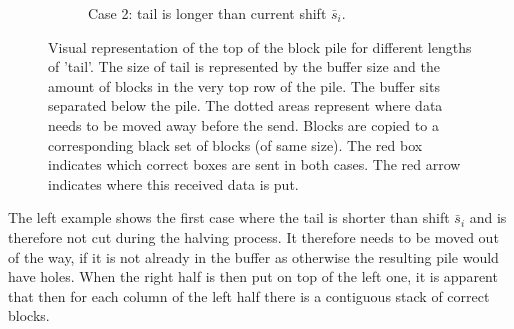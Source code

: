 \begin{figure}[h]
\begin{subfigure}{0.49\textwidth}
	\caption{Case 2: tail is longer than current shift $\bar{s}_i$.}
	\label{pileCases:case2}
	\end{subfigure}
%		
%		
%		
%

	\caption{Visual representation of the top of the block pile for different lengths of 'tail'. The size of tail is represented by the buffer size and the amount of blocks in the very top row of the pile. The buffer sits separated below the pile. The dotted areas represent where data needs to be moved away before the send. Blocks are copied to a corresponding black set of blocks (of same size). The red box indicates which correct boxes are sent in both cases. The red arrow indicates where this received data is put.}
	\label{fig:pileCases}
\end{figure}
The left example shows the first case where the tail is shorter than shift $\bar{s}_i$ and is therefore not cut during the halving process. It therefore needs to be moved out of the way, if it is not already in the buffer as otherwise the resulting pile would have holes. When the right half is then put on top of the left one, it is apparent that then for each column of the left half there is a contiguous stack of correct blocks.\\
